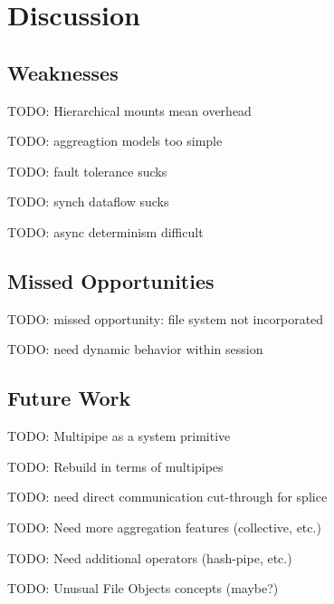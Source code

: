 \section{Discussion}

\subsection{Weaknesses}
TODO: Hierarchical mounts mean overhead

TODO: aggreagtion models too simple

TODO: fault tolerance sucks

TODO: synch dataflow sucks

TODO: async determinism difficult

\subsection{Missed Opportunities}
TODO: missed opportunity: file system not incorporated

TODO: need dynamic behavior within session

\subsection{Future Work} 
TODO: Multipipe as a system primitive

TODO: Rebuild in terms of multipipes

TODO: need direct communication cut-through for splice

TODO: Need more aggregation features (collective, etc.)

TODO: Need additional operators (hash-pipe, etc.)

TODO: Unusual File Objects concepts (maybe?)
